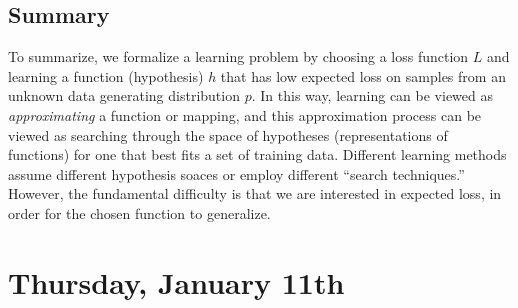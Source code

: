 \documentclass[11 pt]{scrartcl}
\begin{document}
\subsection{Summary}
To summarize, we formalize a learning problem by choosing a loss function $L$ and learning a function (hypothesis) $h$ that has low expected loss on samples from an unknown data generating distribution $p$. In this way, learning can be viewed as \textit{approximating} a function or mapping, and this approximation process can be viewed as searching through the space of hypotheses (representations of functions) for one that best fits a set of training data. Different learning methods assume different hypothesis soaces or employ different ``search techniques.'' However, the fundamental difficulty is that we are interested in expected loss, in order for the chosen function to generalize. 
\newpage

\section{Thursday, January 11th}
\end{document}
